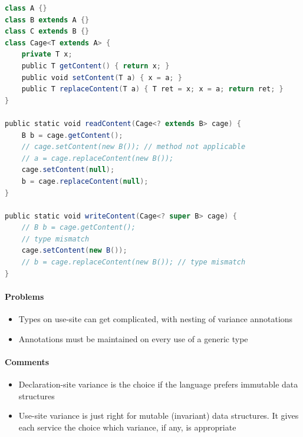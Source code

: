 \begin{lstlisting}[language=scala,mathescape=false]
class A {}
class B extends A {}
class C extends B {}
class Cage<T extends A> {
    private T x;
    public T getContent() { return x; }
    public void setContent(T a) { x = a; }
    public T replaceContent(T a) { T ret = x; x = a; return ret; }
}

public static void readContent(Cage<? extends B> cage) {
    B b = cage.getContent();
    // cage.setContent(new B()); // method not applicable
    // a = cage.replaceContent(new B());
    cage.setContent(null);
    b = cage.replaceContent(null);
}

public static void writeContent(Cage<? super B> cage) {
    // B b = cage.getContent();
    // type mismatch
    cage.setContent(new B());
    // b = cage.replaceContent(new B()); // type mismatch
}
\end{lstlisting}

\hypertarget{problems}{%
\paragraph{Problems}\label{problems}}

\begin{itemize}
\tightlist
\item
  Types on use-site can get complicated, with nesting of variance
  annotations
\item
  Annotations must be maintained on every use of a generic type
\end{itemize}

\hypertarget{comments}{%
\paragraph{Comments}\label{comments}}

\begin{itemize}
\tightlist
\item
  Declaration-site variance is the choice if the language prefers
  immutable data structures
\item
  Use-site variance is just right for mutable (invariant) data
  structures. It gives each service the choice which variance, if any,
  is appropriate
\end{itemize}

\clearpage